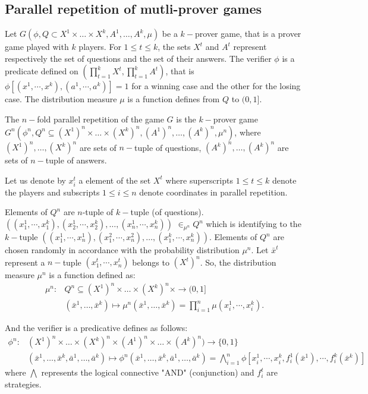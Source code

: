 \subsection{Parallel repetition of mutli-prover games}

Let $G(\phi, Q \subset X^1 \times \ldots \times X^k, A^1, \ldots, A^k, \mu)$ be a $k-$prover game, that is a prover game played with $k$ players. For $1 \leq t \leq k$, the sets $X^t$ and $A^t$ represent respectively the set of questions and the set of their answers. The verifier $\phi$ is a predicate  defined on $\left( \prod\limits_{t=1}^k X^t, \prod\limits_{t=1}^k A^t \right)$, that is $\phi [(x^1, \cdots , x^k),(a^1, \cdots , a^k)]=1$ for a winning case and  the other for the losing case. The distribution measure $\mu$ is a function defines from $Q$ to $(0,1].$

The $n-$fold parallel repetition of the game $G$ is the $k-$prover game $G^n(\phi^n, Q^n \subseteq (X^1)^n \times \ldots \times (X^k)^n, (A^1)^n, \ldots,( A^k)^n, \mu^n)$, where  $(X^1)^n , \ldots, (X^k)^n$ are sets of $n-$tuple of questions, $(A^k)^n , \ldots, (A^k)^n$ are sets of $n-$tuple of answers. 

Let us denote by $x_i^t$ a element of the set $X^t$ where superscripts $1\leq t \leq k$   denote the players and subscripts $1 \leq i \leq n$  denote  coordinates in parallel repetition.

Elements of $Q^n$ are $n$-tuple of $k-$tuple (of questions). $((x_1^1, \cdots , x_1^k), (x_2^1, \cdots , x_2^k),\ldots, (x_n^1, \cdots , x_n^k))$ $ \in_{\mu^n} Q^n$ which is identifying to the $k-$tuple $((x_1^1, \cdots , x_n^1), (x_1^2, \cdots , x_n^2),\ldots, (x_1^k, \cdots , x_n^k))$. Elements of $Q^n$ are chosen randomly  in accordance with the probability distribution $\mu^n$. Let $\bar{x}^t$ represent a $n-$tuple $(x_1^t, \cdots , x_n^t)$ belongs to $(X^t)^n$.
So, the distribution measure $\mu^n$ is a function defined as:
\begin{align*}
\mu^n:  & Q^n \subseteq (X^1)^n \times \ldots \times (X^k)^n \times  \longrightarrow (0,1] \\
  & (\bar{x}^1,\ldots, \bar{x}^k) \longmapsto \mu^n(\bar{x}^1,\ldots, \bar{x}^k)=\prod_{i=1}^n  \mu (x_i^1, \cdots , x_i^k). 
 \end{align*}

And  the verifier is a predicative defines as follows:
\begin{align*}
\phi^n: &(X^1)^n \times \ldots \times (X^k)^n \times (A^1)^n \times \ldots \times ( A^k)^n)  \longrightarrow  \{0,1\}\\ 
& (\bar{x}^1,\ldots, \bar{x}^k,\bar{a}^1, \ldots, \bar{a}^k)  \longmapsto  \phi^n (\bar{x}^1,\ldots, \bar{x}^k,\bar{a}^1, \ldots, \bar{a}^k) = \bigwedge\limits_{i=1}^n \phi [x_i^1, \cdots , x_i^k, f_i^1(\bar{x}^1), \cdots ,  f_i^k(\bar{x}^k)]
\end{align*}
where $\bigwedge$ represents the logical connective "AND" (conjunction) and $f_i^t$ are strategies.

